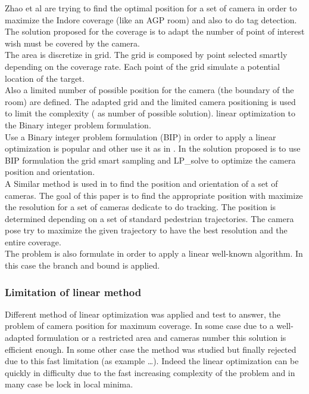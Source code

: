 Zhao  et al \cite{22*zhao2008} are trying to find the optimal position for a set of camera in order to maximize the  Indore coverage (like an AGP room) and also to  do tag detection.
The solution proposed for the coverage is to adapt the number of point of interest wish must be covered by the camera. \\
The area is discretize in grid.  The grid is composed by point selected smartly depending on the coverage rate. Each point of the grid simulate a potential location of the target.\\
Also a limited number of possible position for the camera (the boundary of the room) are defined.
The adapted grid and the limited camera positioning is used to limit the complexity ( as number of possible solution).  linear optimization to the Binary integer problem formulation. \\
Use a Binary integer problem formulation (BIP) in order to apply a linear optimization is popular and other use it as in \cite{22*zhao2008,27*bodor2005,43*erdem2006}. In \cite{22*zhao2008} the solution proposed is to use BIP formulation the grid smart sampling and LP\_solve to optimize the camera position and orientation.\\

 A Similar method is used in \cite{27*bodor2005} to find the position and orientation of a set of cameras. The goal of this paper is to find the appropriate position with maximize the resolution for a set of cameras dedicate to do tracking. The position is determined depending on a set of standard pedestrian trajectories. The camera pose try to maximize the given trajectory to have the best resolution and the entire coverage. \\
The problem is also formulate in order to apply a linear well-known algorithm. In this case the branch and bound is applied.  

\subsubsection{	Limitation of linear method}
Different method of linear optimization was applied and test to answer, the problem of camera position for maximum coverage. In some case due to a well-adapted formulation or a restricted area and cameras number this solution is efficient enough. In some other case the method was studied but finally rejected due to this fast limitation (as example \cite{141*akbarzadeh2013,151*zhao2013,82*chrysostomou2012} …). Indeed the linear optimization can be quickly in difficulty due to the fast increasing complexity of the problem and in many case be lock in local minima.


